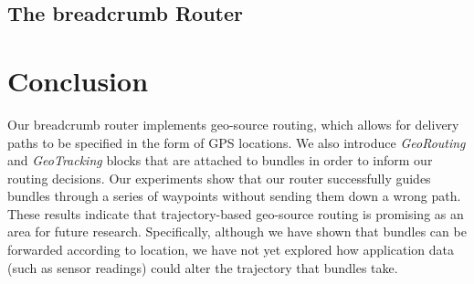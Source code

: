 \documentclass{sig-alternate}
\begin{document}






\subsection{The {\sc\large breadcrumb} Router}



%
%




%
%
\section{Conclusion}

Our {\sc breadcrumb} router implements geo-source routing, which allows for delivery paths to be specified in the form of GPS locations. We also introduce {\em GeoRouting} and {\em GeoTracking} blocks that are attached to bundles in order to inform our routing decisions. Our experiments show that our router successfully guides bundles through a series of waypoints without sending them down a wrong path. These results indicate that trajectory-based geo-source routing is promising as an area for future research. Specifically, although we have shown that bundles can be forwarded according to location, we have not yet explored how application data (such as sensor readings) could alter the trajectory that bundles take.



%
%
%
%
%
%
%
%
%
%



\end{document}
